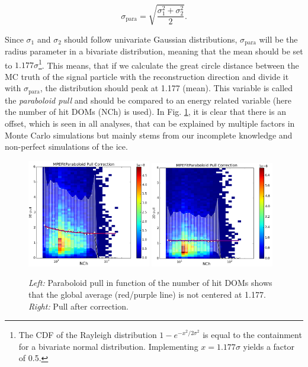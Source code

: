 \begin{equation}
\label{eq:paraboloid}
\sigma_\textrm{para} = \sqrt{\frac{\sigma_1^2 + \sigma_2^2}{2}}.
\end{equation}

\noindent Since $\sigma_1$ and $\sigma_2$ should follow univariate Gaussian distributions, $\sigma_\textrm{para}$ will be the radius parameter in a bivariate distribution, meaning that the mean should be set to $1.177\sigma$\footnote{The CDF of the Rayleigh distribution $1-e^{-x^2/2\sigma^2}$ is equal to the containment for a bivariate normal distribution. Implementing $x=1.177\sigma$ yields a factor of 0.5.}. This means, that if we calculate the great circle distance between the MC truth of the signal particle with the reconstruction direction and divide it with $\sigma_\textrm{para}$, the distribution should peak at 1.177 (mean). This variable is called the \textit{paraboloid pull} and should be compared to an energy related variable (here the number of hit DOMs (NCh) is used). In Fig. \ref{fig:paraboloidpull}, it is clear that there is an offset, which is seen in all analyses, that can be explained by multiple factors in Monte Carlo simulations but mainly stems from our incomplete knowledge and non-perfect simulations of the ice.

\begin{figure}[t]
\centering
\includegraphics[width=0.48\textwidth]{chapter7/img/pullbeforecorrection.png}
\includegraphics[width=0.48\textwidth]{chapter7/img/pullaftercorrection.png}
\caption{\textit{Left: }Paraboloid pull in function of the number of hit DOMs shows that the global average (red/purple line) is not centered at 1.177. \textit{Right: }Pull after correction.}
\label{fig:paraboloidpull}
\end{figure}

